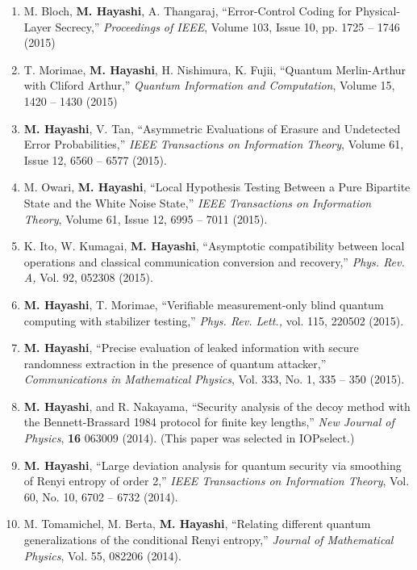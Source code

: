\documentclass[a4paper,12pt,oneside]{article}
\begin{document}
\begin{enumerate}
\item 
M. Bloch, \textbf{M. Hayashi}, A. Thangaraj, ``Error-Control Coding for Physical-Layer Secrecy,'' 
{\em Proceedings of IEEE}, Volume 103, Issue 10, pp. 1725 -- 1746 (2015) 

\item 
T. Morimae, \textbf{M. Hayashi}, H. Nishimura, K. Fujii, ``Quantum Merlin-Arthur with Cliford Arthur,'' 
{\em Quantum Information and Computation}, 
Volume 15, 1420 -- 1430 (2015)

\item 
\textbf{M. Hayashi}, V. Tan, ``Asymmetric Evaluations of Erasure and Undetected Error Probabilities,'' 
{\em IEEE Transactions on Information Theory}, Volume 61, Issue 12, 6560 -- 6577 (2015). 

\item 
M. Owari, \textbf{M. Hayashi}, ``Local Hypothesis Testing Between a Pure Bipartite State and the White Noise State,'' 
{\em IEEE Transactions on Information Theory}, 
Volume 61, Issue 12, 6995 -- 7011 (2015).

\item 
K. Ito, W. Kumagai, \textbf{M. Hayashi}, ``Asymptotic compatibility between local operations and classical communication conversion and recovery,'' 
{\em Phys. Rev. A,} Vol. 92, 052308 (2015). 

\item 
\textbf{M. Hayashi}, T. Morimae, ``Verifiable measurement-only blind quantum computing with stabilizer testing,'' 
{\em Phys. Rev. Lett.,} vol. 115, 220502 (2015). 

\item 
\textbf{M. Hayashi},
``Precise evaluation of leaked information with secure randomness extraction in the
presence of quantum attacker,'' {\em Communications in Mathematical Physics},
Vol. 333, No. 1, 335 -- 350 (2015).

\item 
\textbf{M. Hayashi}, and R. Nakayama, 
``Security analysis of the decoy method with the Bennett-Brassard 1984 protocol for finite key lengths,'' 
{\em New Journal of Physics}, {\bf 16} 063009 (2014).
(This paper was selected in IOPselect.)

\item 
\textbf{M. Hayashi}, 
``Large deviation analysis for quantum security via smoothing of Renyi entropy of order 2,'' 
{\em IEEE Transactions on Information Theory},
 Vol. 60,  No. 10, 6702 -- 6732 (2014).

\item 
M. Tomamichel, M. Berta, \textbf{M. Hayashi},
``Relating different quantum generalizations of the conditional
Renyi entropy,'' 
{\em Journal of Mathematical Physics}, Vol. 55, 082206 (2014).


\end{enumerate}
\end{document}
